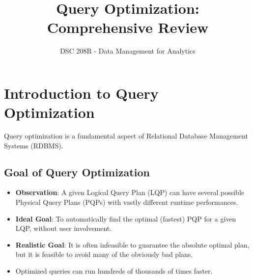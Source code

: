\documentclass{article}
\title{Query Optimization: Comprehensive Review}
\author{DSC 208R - Data Management for Analytics}
\date{}
\begin{document}
\maketitle

\section*{Introduction to Query Optimization}
Query optimization is a fundamental aspect of Relational Database Management Systems (RDBMS).

\subsection*{Goal of Query Optimization}
\begin{itemize}
    \item \textbf{Observation}: A given Logical Query Plan (LQP) can have several possible Physical Query Plans (PQPs) with vastly different runtime performances.
    \item \textbf{Ideal Goal}: To automatically find the optimal (fastest) PQP for a given LQP, without user involvement.
    \item \textbf{Realistic Goal}: It is often infeasible to guarantee the absolute optimal plan, but it is feasible to avoid many of the obviously bad plans.
    \item Optimized queries can run hundreds of thousands of times faster.
\end{itemize}
\end{document}
